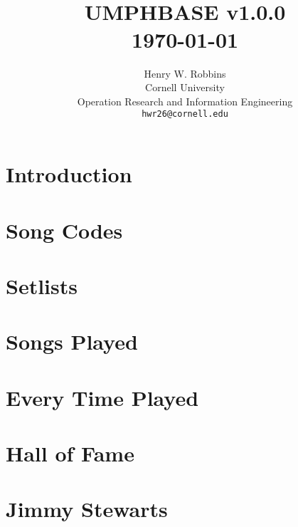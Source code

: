 \documentclass[8pt]{book}
\title{	\normalsize \textsc{} 					%
        \\[2.0cm]
        \HRule{2pt} \\ [0.5cm]
	\Huge \textbf{\uppercase{UMPHBASE} v1.0.0}	%
	\HRule{2pt} \\ [0.5cm]
	\large \today						%
}
\author{
	Henry W. Robbins\\
	Cornell University\\
	Operation Research and Information Engineering\\
        \texttt{hwr26@cornell.edu} \\
}
\makeatletter
\def\printtitle{%
    {\centering \@title\par}}
\def\printauthor{
    {\centering \large \@author}}
\makeatother
\begin{document}
\thispagestyle{empty}
\printtitle
\vfill
\printauthor
\newpage

\tableofcontents
\newpage

\chapter{Introduction}


\chapter{Song Codes}




\chapter{Setlists}




\chapter{Songs Played}


\newpage


\chapter{Every Time Played}




\chapter{Hall of Fame}



\chapter{Jimmy Stewarts}
\end{document}
